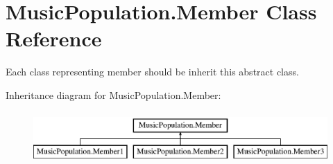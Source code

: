 \hypertarget{class_music_population_1_1_member}{\section{Music\+Population.\+Member Class Reference}
\label{class_music_population_1_1_member}
}


Each class representing member should be inherit this abstract class.  


Inheritance diagram for Music\+Population.\+Member\+:\begin{figure}[H]
\begin{center}
\leavevmode
\includegraphics[height=2.000000cm]{class_music_population_1_1_member}
\end{center}
\end{figure}

